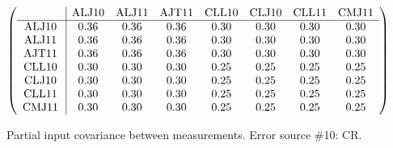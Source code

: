 \begin{table}[H]
\scriptsize
\begin{center}
\renewcommand{\arraystretch}{1.1}
\begin{math}\left(\begin{array}{c|ccccccc}
 & \mathrm{ALJ10} & 
\mathrm{ALJ11} & 
\mathrm{AJT11} & 
\mathrm{CLL10} & 
\mathrm{CLJ10} & 
\mathrm{CLL11} & 
\mathrm{CMJ11} \\
\hline
\mathrm{ALJ10} \hspace*{2pt} &       0.36 &       0.36 &       0.36 &       0.30 &       0.30 &       0.30 &       0.30 \\
\mathrm{ALJ11} \hspace*{2pt} &       0.36 &       0.36 &       0.36 &       0.30 &       0.30 &       0.30 &       0.30 \\
\mathrm{AJT11} \hspace*{2pt} &       0.36 &       0.36 &       0.36 &       0.30 &       0.30 &       0.30 &       0.30 \\
\mathrm{CLL10} \hspace*{2pt} &       0.30 &       0.30 &       0.30 &       0.25 &       0.25 &       0.25 &       0.25 \\
\mathrm{CLJ10} \hspace*{2pt} &       0.30 &       0.30 &       0.30 &       0.25 &       0.25 &       0.25 &       0.25 \\
\mathrm{CLL11} \hspace*{2pt} &       0.30 &       0.30 &       0.30 &       0.25 &       0.25 &       0.25 &       0.25 \\
\mathrm{CMJ11} \hspace*{2pt} &       0.30 &       0.30 &       0.30 &       0.25 &       0.25 &       0.25 &       0.25 \\
\end{array}\right)\end{math}
\caption{Partial input covariance between measurements. Error source \#10: CR.}
\renewcommand{\arraystretch}{1}
\end{center}
\end{table}

